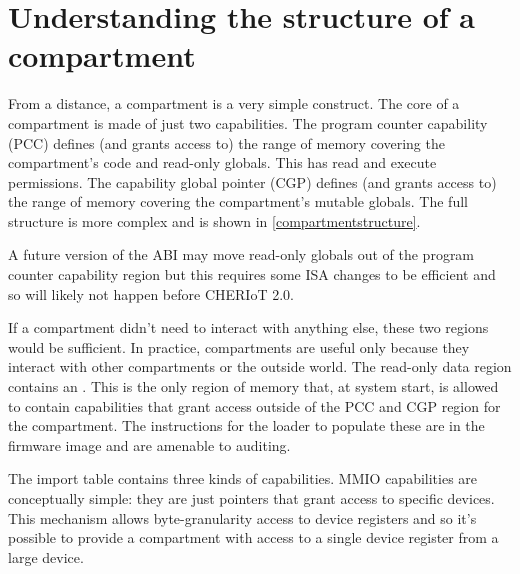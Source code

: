 \section{Understanding the structure of a compartment}

From a distance, a compartment is a very simple construct.
The core of a compartment is made of just two capabilities.
The program counter capability (PCC) defines (and grants access to) the range of memory covering the compartment's code and read-only globals.
This has read and execute permissions.
The capability global pointer (CGP) defines (and grants access to) the range of memory covering the compartment's mutable globals.
The full structure is more complex and is shown in \ref{compartmentstructure}.



\begin{note}
A future version of the ABI may move read-only globals out of the program counter capability region but this requires some ISA changes to be efficient and so will likely not happen before CHERIoT 2.0.
\end{note}

If a compartment didn't need to interact with anything else, these two regions would be sufficient.
In practice, compartments are useful only because they interact with other compartments or the outside world.
The read-only data region contains an .
This is the only region of memory that, at system start, is allowed to contain capabilities that grant access outside of the PCC and CGP region for the compartment.
The instructions for the loader to populate these are in the firmware image and are amenable to auditing.

The import table contains three kinds of capabilities.
MMIO capabilities are conceptually simple: they are just pointers that grant access to specific devices.
This mechanism allows byte-granularity access to device registers and so it's possible to provide a compartment with access to a single device register from a large device.

